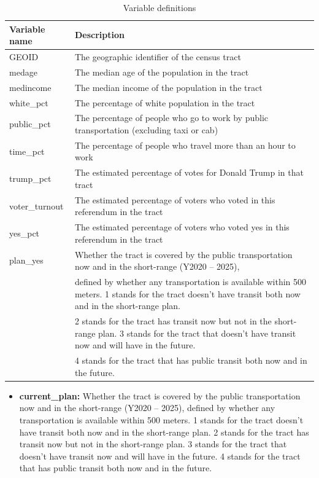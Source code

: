 \documentclass[
]{article}
\providecommand{\tightlist}{%
  \setlength{\itemsep}{0pt}\setlength{\parskip}{0pt}}
\begin{document}
\begin{table}
\centering
\caption{Variable definitions}
\label{variableDefinitions}
\begin{tabular}{ll}
\hline
\hline
Variable name      & Description                                   \\
\hline
GEOID          & The geographic identifier of the census tract                 \\
medage        & The median age of the population in the tract               \\
medincome        & The median income of the population in the tract               \\
white\_pct           & The percentage of white population in the tract      \\
public\_pct          & The percentage of people who go to work by public transportation (excluding taxi or cab)      \\
time\_pct           & The percentage of people who travel more than an hour to work      \\
trump\_pct          & The estimated percentage of votes for Donald Trump in that tract      \\
voter\_turnout  & The estimated percentage of voters who voted in this referendum in the tract \\
yes\_pct           & The estimated percentage of voters who voted yes in this referendum in the tract      \\
plan\_yes          & Whether the tract is covered by the public transportation now and in the short-range (Y2020 – 2025), \\ & defined by whether any transportation is available within 500 meters. 1 stands for the tract doesn't have transit both now and in the short-range plan. \\ & 2 stands for the tract has transit now but not in the short-range plan. 3 stands for the tract that doesn't have transit now and will have in the future.\\ & 4 stands for the tract that has public transit both now and in the future.      \\

\hline
\end{tabular}
\end{table}

\begin{itemize}
\tightlist
\item
  \textbf{current\_plan:} Whether the tract is covered by the public
  transportation now and in the short-range (Y2020 -- 2025), defined by
  whether any transportation is available within 500 meters. 1 stands
  for the tract doesn't have transit both now and in the short-range
  plan. 2 stands for the tract has transit now but not in the
  short-range plan. 3 stands for the tract that doesn't have transit now
  and will have in the future. 4 stands for the tract that has public
  transit both now and in the future.
\end{itemize}
\end{document}
